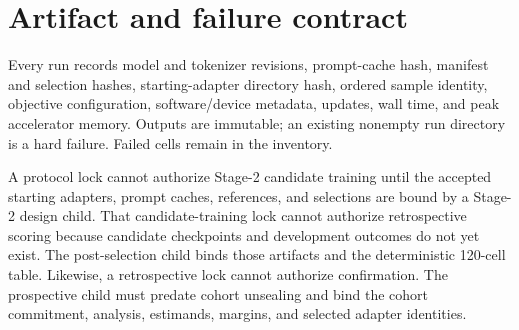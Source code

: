 \section{Artifact and failure contract}

Every run records model and tokenizer revisions, prompt-cache hash, manifest and
selection hashes, starting-adapter directory hash, ordered sample identity,
objective configuration, software/device metadata, updates, wall time, and peak
accelerator memory. Outputs are immutable; an existing nonempty run directory is
a hard failure. Failed cells remain in the inventory.

A protocol lock cannot authorize Stage-2 candidate training until the accepted
starting adapters, prompt caches, references, and selections are bound by a
Stage-2 design child. That candidate-training lock cannot authorize retrospective scoring because
candidate checkpoints and development outcomes do not yet exist. The
post-selection child binds those artifacts and the deterministic 120-cell table.
Likewise, a retrospective lock cannot authorize confirmation. The prospective
child must predate cohort unsealing and bind the cohort commitment, analysis,
estimands, margins, and selected adapter identities.
